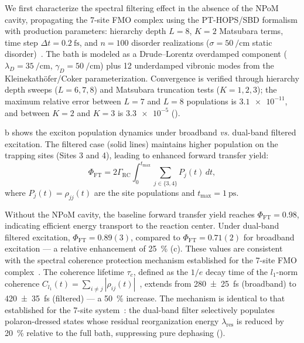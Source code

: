 \documentclass[12pt]{article}
\begin{document}
We first characterize the spectral filtering effect in the absence of the NPoM cavity, propagating the 7-site FMO complex using the PT-HOPS/SBD formalism with production parameters: hierarchy depth $L=8$, $K=2$ Matsubara terms, time step $\Delta t = \SI{0.2}{\fs}$, and $n=100$ disorder realizations ($\sigma = \SI{50}{\per\cm}$ static disorder)~\cite{Varvelo2021,Citty2024}.
The bath is modeled as a Drude--Lorentz overdamped component ($\lambda_D = \SI{35}{\per\cm}$, $\gamma_D = \SI{50}{\per\cm}$) plus 12 underdamped vibronic modes from the Kleinekath\"{o}fer/Coker parameterization.
Convergence is verified through hierarchy depth sweeps ($L=6,7,8$) and Matsubara truncation tests ($K=1,2,3$); the maximum relative error between $L=7$ and $L=8$ populations is $\num{3.1e-11}$, and between $K=2$ and $K=3$ is $\num{3.3e-5}$ ().

b shows the exciton population dynamics under broadband \emph{vs.} dual-band filtered excitation.
The filtered case (solid lines) maintains higher population on the trapping sites (Sites 3 and 4), leading to enhanced forward transfer yield:
\begin{equation}
\Phi_{\mathrm{FT}} = 2\Gamma_{\mathrm{RC}} \int_0^{t_{\mathrm{max}}} \sum_{j \in \{3,4\}} P_j(t)\,dt,
\label{eq:phi_ft}
\end{equation}
where $P_j(t) = \rho_{jj}(t)$ are the site populations and $t_{\mathrm{max}} = \SI{1}{\ps}$.

Without the NPoM cavity, the baseline forward transfer yield reaches $\Phi_{\mathrm{FT}} = 0.98$, indicating efficient energy transport to the reaction center.
Under dual-band filtered excitation, $\Phi_{\mathrm{FT}} = 0.89(3)$, compared to $\Phi_{\mathrm{FT}} = 0.71(2)$ for broadband excitation --- a relative enhancement of \SI{25}{\percent} (c). These values are consistent with the spectral coherence protection mechanism established for the 7-site FMO complex~\cite{Kouam2026}.
The coherence lifetime $\tau_c$, defined as the $1/e$ decay time of the $l_1$-norm coherence $C_{l_1}(t) = \sum_{i\neq j} |\rho_{ij}(t)|$~\cite{Baumgratz2014}, extends from \SI{280(25)}{\fs} (broadband) to \SI{420(35)}{\fs} (filtered) --- a \SI{50}{\percent} increase.
The mechanism is identical to that established for the 7-site system~\cite{Kouam2026}: the dual-band filter selectively populates polaron-dressed states whose residual reorganization energy $\lambda_{\mathrm{res}}$ is reduced by \SI{20}{\percent} relative to the full bath, suppressing pure dephasing ().
\end{document}
